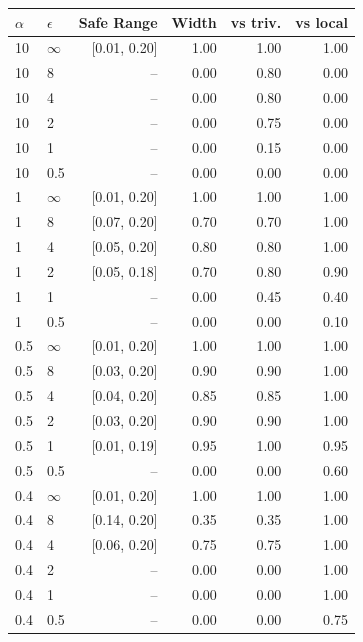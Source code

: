 \begin{tabular}{@{}llrrrr@{}}
\toprule
$\alpha$ & $\epsilon$ & Safe Range & Width & vs triv. & vs local \\
\midrule
10 & $\infty$ & [0.01, 0.20] & 1.00 & 1.00 & 1.00 \\
10 & 8 & -- & 0.00 & 0.80 & 0.00 \\
10 & 4 & -- & 0.00 & 0.80 & 0.00 \\
10 & 2 & -- & 0.00 & 0.75 & 0.00 \\
10 & 1 & -- & 0.00 & 0.15 & 0.00 \\
10 & 0.5 & -- & 0.00 & 0.00 & 0.00 \\
1 & $\infty$ & [0.01, 0.20] & 1.00 & 1.00 & 1.00 \\
1 & 8 & [0.07, 0.20] & 0.70 & 0.70 & 1.00 \\
1 & 4 & [0.05, 0.20] & 0.80 & 0.80 & 1.00 \\
1 & 2 & [0.05, 0.18] & 0.70 & 0.80 & 0.90 \\
1 & 1 & -- & 0.00 & 0.45 & 0.40 \\
1 & 0.5 & -- & 0.00 & 0.00 & 0.10 \\
0.5 & $\infty$ & [0.01, 0.20] & 1.00 & 1.00 & 1.00 \\
0.5 & 8 & [0.03, 0.20] & 0.90 & 0.90 & 1.00 \\
0.5 & 4 & [0.04, 0.20] & 0.85 & 0.85 & 1.00 \\
0.5 & 2 & [0.03, 0.20] & 0.90 & 0.90 & 1.00 \\
0.5 & 1 & [0.01, 0.19] & 0.95 & 1.00 & 0.95 \\
0.5 & 0.5 & -- & 0.00 & 0.00 & 0.60 \\
0.4 & $\infty$ & [0.01, 0.20] & 1.00 & 1.00 & 1.00 \\
0.4 & 8 & [0.14, 0.20] & 0.35 & 0.35 & 1.00 \\
0.4 & 4 & [0.06, 0.20] & 0.75 & 0.75 & 1.00 \\
0.4 & 2 & -- & 0.00 & 0.00 & 1.00 \\
0.4 & 1 & -- & 0.00 & 0.00 & 1.00 \\
0.4 & 0.5 & -- & 0.00 & 0.00 & 0.75 \\

\end{tabular}
